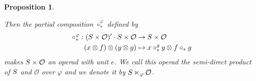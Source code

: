 \documentclass[11pt]{article}
\newtheorem{prop}[theo]{Proposition}
\theoremstyle{definition}
\numberwithin{equation}{section}
\newcommand{\spe}[1]{\normalfont{\textsc{#1}}}
\newcommand{\comp}[1][\ast]{\circ_{#1}}
\newcommand{\Operad}{\mathcal{O}}
\begin{document}
\begin{prop}
\begin{description}
    \end{description}
    Then the partial composition $\comp^{\varphi}$ defined by
    \begin{equation}\begin{split}
        \comp^{\varphi}: (\spe{S}\times\Operad)'\cdot \spe{S}\times\Operad &\to \spe{S}\times\Operad \\
        (x\otimes f)\otimes (y\otimes g) &\mapsto x\comp^g y\otimes f\comp g
    \end{split}\end{equation}
    makes $\spe{S}\times\Operad$ an operad with unit $e$. We call this operad the {\em semi-direct product 
    of $\spe{S}$ and $\Operad$ over $\varphi$} and we denote it by $\spe{S}\ltimes_{\varphi}\Operad$.
\end{prop}
\end{document}
